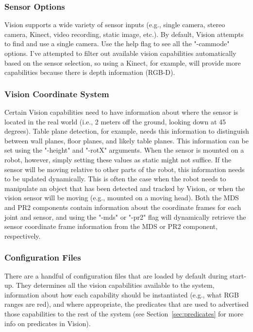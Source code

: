 \documentclass{article}
\begin{document}
\subsubsection{Sensor Options}
Vision supports a wide variety of sensor inputs (e.g., single camera, stereo camera,
Kinect, video recording, static image, etc.). By default, Vision attempts to find
and use a single camera. Use the help flag to see all the "-cammode" options.
I've attempted to filter out available vision capabilities automatically based
on the sensor selection, so using a Kinect, for example, will provide more capabilities
because there is depth information (RGB-D).

\subsubsection{Vision Coordinate System}
Certain Vision capabilities need to have information about where the sensor is located
in the real world (i.e., 2 meters off the ground, looking down at 45 degrees). Table
plane detection, for example, needs this information to distinguish between wall planes,
floor planes, and likely table planes. This information can be set using the "-height"
and "-rotX" arguments. When the sensor is mounted on a robot, however, simply 
setting these values as static might not suffice. If the sensor will be moving 
relative to other parts of the robot, this information needs to be updated dynamically.
This is often the case when the robot needs to manipulate an object that has been
detected and tracked by Vision, or when the vision sensor will be moving (e.g., mounted
on a moving head). Both the MDS and PR2 components contain information about the
coordinate frames for each joint and sensor, and using the "-mds" or "-pr2" flag
will dynamically retrieve the sensor coordinate frame information from
the MDS or PR2 component, respectively.

\subsubsection{Configuration Files}
\label{sec:config_files}
There are a handful of configuration files that are loaded by default during start-up.
They determines all the vision capabilities available to the system, information
about how each capability should be instantiated (e.g., what RGB ranges are red),
and where appropriate, the predicates that are used to advertised those capabilities
to the rest of the system (see Section~\ref{sec:predicates} for more info on predicates in Vision).
\end{document}
